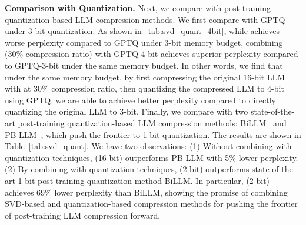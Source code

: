 \vspace{1mm}
\noindent\textbf{Comparison with Quantization.} 
%
Next, we compare \sysname with post-training quantization-based LLM compression methods. 
%
We first compare \sysname with GPTQ~\citep{DBLP:journals/corr/abs-2210-17323} under 3-bit quantization. As shown in~\cref{tab:svd_quant_4bit}, while \sysname achieves worse perplexity compared to GPTQ under 3-bit memory budget, 
combining \sysname (30\% compression ratio) with GPTQ-4-bit achieves superior perplexity compared to GPTQ-3-bit under the same memory budget. 
In other words, we find that under the same memory budget, by first compressing the original 16-bit LLM with \sysname at 30\% compression ratio, then quantizing the compressed LLM to 4-bit using GPTQ, we are able to achieve better perplexity compared to directly quantizing the original LLM to 3-bit.  
%
Finally, we compare \sysname with  two state-of-the-art post-training quantization-based LLM compression methods: BiLLM~\citep{DBLP:conf/icml/HuangLQLZ0M024} and PB-LLM~\citep{DBLP:conf/iclr/YuanSD24}, which push the frontier to 1-bit quantization.
%
The results are shown in Table~\ref{tab:svd_quant}. 
%
We have two observations: (1) Without combining with quantization techniques, \sysname (16-bit) outperforms PB-LLM with 5\% lower perplexity.
%
%
(2) By combining with quantization techniques, \sysname (2-bit) outperforms state-of-the-art 1-bit post-training quantization method BiLLM. In particular, \sysname (2-bit) achieves 69\% lower perplexity than BiLLM, showing the promise of combining SVD-based and quantization-based compression methods for pushing the frontier of post-training LLM compression forward.


\vspace{0mm}
\svdquanthighTable

\vspace{0mm}
\svdquantTable

\label{subsection:Comparison_with_other_compression_methods}